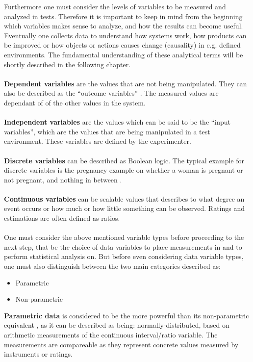 Furthermore one must consider the levels of variables to be measured and analyzed in tests. Therefore it is important to keep in mind from the beginning which variables makes sense to analyze, and how the results can become useful. Eventually one collects data to understand how systems work, how products can be improved or how objects or actions causes change (causality) in e.g. defined environments. The fundamental understanding of these analytical terms will be shortly described in the following chapter.\\\\
\textbf{Dependent variables} are the values that are not being manipulated. They can also be described as the “outcome variables” \citep[page 21]{Design}. The measured values are dependant of of the other values in the system.\\\\
\textbf{Independent variables} are the values which can be said to be the “input variables”, which are the values that are being manipulated in a test environment. These variables are defined by the experimenter.\\\\
\textbf{Discrete variables} can be described as Boolean logic. The typical example for discrete variables is the pregnancy example on whether a woman is pregnant or not pregnant, and nothing in between \citep[page 9]{Design}.\\\\
\textbf{Continuous variables} can be scalable values that describes to what degree an event occurs or how much or how little something can be observed. Ratings and estimations are often defined as ratios. 
\\\\One must consider the above mentioned variable types before proceeding to the next step, that be the choice of data variables to place measurements in and to perform statistical analysis on. But before even considering data variable types, one must also distinguish between the two main categories described as: 
\begin{itemize}
\item Parametric
\item Non-parametric
\end{itemize}
\textbf{Parametric data} is considered to be the more powerful than its non-parametric equivalent \citep[page 21]{Design}, as it can be described as being: normally-distributed, based on arithmetic measurements of the continuous interval/ratio variable. The measurements are compareable as they represent concrete values measured by instruments or ratings.
